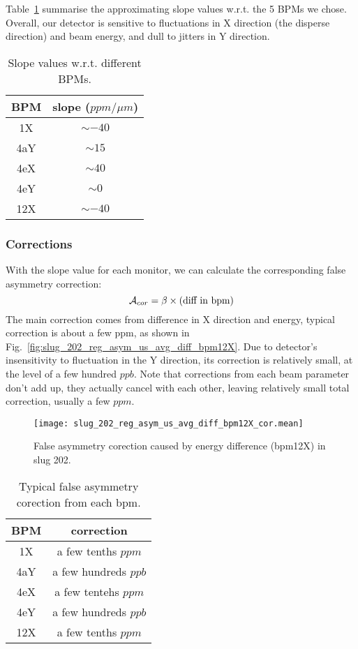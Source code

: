 Table~\ref{tab:crex_slope} summarise the approximating slope values w.r.t. the 5
BPMs we chose. Overall, our detector is sensitive to fluctuations in X direction
(the disperse direction) and beam energy, and dull to jitters in Y direction.
\begin{table}[!h]
    \centering
    \begin{tabular}{c | c}
	\hline
	BPM & slope ($ppm/\mu m$)   \\
	\hline
	1X  & $\sim -40$    \\
	4aY & $\sim 15$    \\
	4eX & $\sim 40$	\\
	4eY & $\sim 0$	\\
	12X & $\sim -40$    \\
	\hline
    \end{tabular}
    \caption{Slope values w.r.t. different BPMs.}
    \label{tab:crex_slope}
\end{table}

\subsubsection{Corrections}
With the slope value for each monitor, we can calculate the corresponding
false asymmetry correction:
\begin{equation}
    \mathcal{A}_{cor} = \beta \times \text{(diff in bpm)}
\end{equation}
The main correction comes from difference in X direction and energy,
typical correction is about a few ppm, as shown in Fig.~\ref{fig:slug_202_reg_asym_us_avg_diff_bpm12X}.
Due to detector's insensitivity to fluctuation in the Y direction, its correction 
is relatively small, at the level of  a few hundred $ppb$. Note that corrections
from each beam parameter don't add up, they actually cancel with each other,
leaving relatively small total correction, usually a few $ppm$.

\begin{figure}[H]
    \centering
    \texttt{[image: slug\_202\_reg\_asym\_us\_avg\_diff\_bpm12X\_cor.mean]}
    \caption{False asymmetry corection caused by energy difference (bpm12X) in
    slug 202.}
    \label{fig:slug_202_reg_asym_us_avg_diff_bpm12X_cor}
\end{figure}

\begin{table}[!h]
    \centering
    \begin{tabular}{c | c}
	\hline
	BPM  & correction   \\
	\hline
	1X  & a few tenths $ppm$ \\
	4aY & a few hundreds $ppb$     \\
	4eX & a few tentehs $ppm$ \\
	4eY & a few hundreds $ppb$     \\
	12X  & a few tenths $ppm$ \\
	\hline
    \end{tabular}
    \caption{Typical false asymmetry corection from each bpm.}
\end{table}


